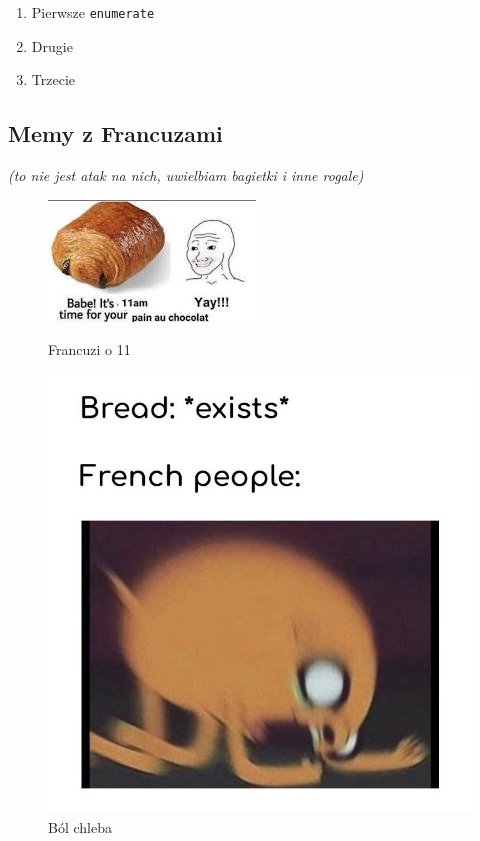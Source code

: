     \begin{enumerate}
        \item Pierwsze \verb|enumerate|
        \item Drugie
        \item Trzecie
    \end{enumerate}



\newpage
\subsection{Memy z Francuzami}
\textit {(to nie jest atak na nich, uwielbiam bagietki i inne rogale)}
    \begin{figure}[htbp]
    \centering
    \begin{minipage}[b]{0.4\textwidth}
        \includegraphics[width=\textwidth]{pictures/chocolat.jpg}
        \caption{Francuzi o 11}
        \label{fig:pain}
    \end{minipage}
    \begin{minipage}[b]{0.4\textwidth}
        \includegraphics[width=\textwidth]{pictures/french.jpg}
        \caption{Ból chleba}
        \label{fig:pain2}
    \end{minipage}
    \end{figure}

